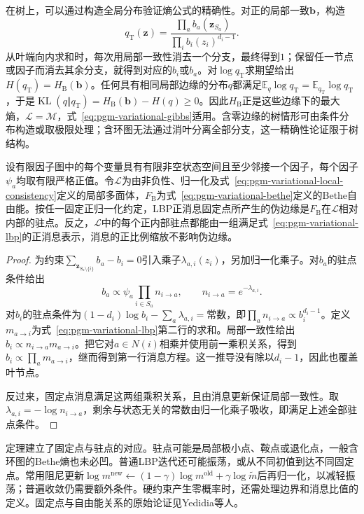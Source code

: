 在树上，可以通过构造全局分布验证熵公式的精确性。对正的局部一致$\bm b$，构造
\[
  q_{\mathrm T}(\bm z)=
    \frac{\prod_a b_a(\bm z_{S_a})}
         {\prod_i b_i(z_i)^{d_i-1}}.
\]
从叶端向内求和时，每次用局部一致性消去一个分支，最终得到$1$；保留任一节点或因子而消去其余分支，就得到对应的$b_i$或$b_a$。对$\log q_{\mathrm T}$求期望给出$H(q_{\mathrm T})=H_{\mathrm B}(\bm b)$。任何具有相同局部边缘的分布$q$都满足$\mathbb E_q\log q_{\mathrm T}=\mathbb E_{q_{\mathrm T}}\log q_{\mathrm T}$，于是$\operatorname{KL}(q\Vert q_{\mathrm T})=H_{\mathrm B}(\bm b)-H(q)\geq0$。因此$H_{\mathrm B}$正是这些边缘下的最大熵，$\mathcal L=\mathcal M$，式~\eqref{eq:pgm-variational-gibbs}适用。含零边缘的树情形可由条件分布构造或取极限处理；含环图无法通过消叶分离全部分支，这一精确性论证限于树结构。

\begin{theorem}[正消息固定点与Bethe驻点]
  \label{thm:pgm-variational-bp-stationary}
  设有限因子图中的每个变量具有有限非空状态空间且至少邻接一个因子，每个因子$\psi_a$均取有限严格正值。令$\mathcal L$为由非负性、归一化及式~\eqref{eq:pgm-variational-local-consistency}定义的局部多面体，$F_{\mathrm B}$为式~\eqref{eq:pgm-variational-bethe}定义的Bethe自由能。按任一固定正归一化约定，LBP正消息固定点所产生的伪边缘是$F_{\mathrm B}$在$\mathcal L$相对内部的驻点。反之，$\mathcal L$中的每个正内部驻点都能由一组满足式~\eqref{eq:pgm-variational-lbp}的正消息表示，消息的正比例缩放不影响伪边缘。
\end{theorem}
\begin{proof}
  为约束$\sum_{\bm z_{S_a\setminus\{i\}}}b_a-b_i=0$引入乘子$\lambda_{a,i}(z_i)$，另加归一化乘子。对$b_a$的驻点条件给出
  \[
    b_a\propto\psi_a\prod_{i\in S_a}n_{i\to a},
    \qquad n_{i\to a}=e^{-\lambda_{a,i}}.
  \]
  对$b_i$的驻点条件为$(1-d_i)\log b_i-\sum_a\lambda_{a,i}=\text{常数}$，即$\prod_a n_{i\to a}\propto b_i^{d_i-1}$。定义$m_{a\to i}$为式~\eqref{eq:pgm-variational-lbp}第二行的求和。局部一致性给出$b_i\propto n_{i\to a}m_{a\to i}$。把它对$a\in N(i)$相乘并使用前一乘积关系，得到$b_i\propto\prod_a m_{a\to i}$，继而得到第一行消息方程。这一推导没有除以$d_i-1$，因此也覆盖叶节点。

  反过来，固定点消息满足这两组乘积关系，且由消息更新保证局部一致性。取$\lambda_{a,i}=-\log n_{i\to a}$，剩余与状态无关的常数由归一化乘子吸收，即满足上述全部驻点条件。
\end{proof}

定理建立了固定点与驻点的对应。驻点可能是局部极小点、鞍点或退化点，一般含环图的Bethe熵也未必凹。普通LBP迭代还可能振荡，或从不同初值到达不同固定点。常用阻尼更新$\log m^{\mathrm{new}}\leftarrow(1-\gamma)\log m^{\mathrm{old}}+\gamma\log\widetilde m$后再归一化，以减轻振荡；普遍收敛仍需要额外条件。硬约束产生零概率时，还需处理边界和消息比值的定义。固定点与自由能关系的原始论证见Yedidia等人。

